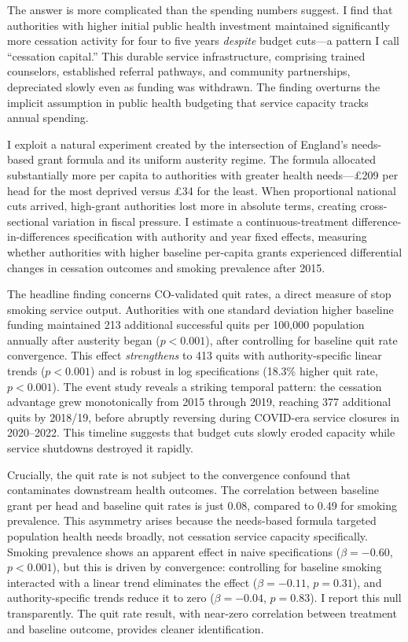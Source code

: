 \documentclass[12pt]{article}
\begin{document}
The answer is more complicated than the spending numbers suggest. I find that authorities with higher initial public health investment maintained significantly more cessation activity for four to five years \textit{despite} budget cuts---a pattern I call ``cessation capital.'' This durable service infrastructure, comprising trained counselors, established referral pathways, and community partnerships, depreciated slowly even as funding was withdrawn. The finding overturns the implicit assumption in public health budgeting that service capacity tracks annual spending.

I exploit a natural experiment created by the intersection of England's needs-based grant formula and its uniform austerity regime. The formula allocated substantially more per capita to authorities with greater health needs---\pounds209 per head for the most deprived versus \pounds34 for the least. When proportional national cuts arrived, high-grant authorities lost more in absolute terms, creating cross-sectional variation in fiscal pressure. I estimate a continuous-treatment difference-in-differences specification with authority and year fixed effects, measuring whether authorities with higher baseline per-capita grants experienced differential changes in cessation outcomes and smoking prevalence after 2015.

The headline finding concerns CO-validated quit rates, a direct measure of stop smoking service output. Authorities with one standard deviation higher baseline funding maintained 213 additional successful quits per 100,000 population annually after austerity began ($p < 0.001$), after controlling for baseline quit rate convergence. This effect \textit{strengthens} to 413 quits with authority-specific linear trends ($p < 0.001$) and is robust in log specifications (18.3\% higher quit rate, $p < 0.001$). The event study reveals a striking temporal pattern: the cessation advantage grew monotonically from 2015 through 2019, reaching 377 additional quits by 2018/19, before abruptly reversing during COVID-era service closures in 2020--2022. This timeline suggests that budget cuts slowly eroded capacity while service shutdowns destroyed it rapidly.

Crucially, the quit rate is not subject to the convergence confound that contaminates downstream health outcomes. The correlation between baseline grant per head and baseline quit rates is just 0.08, compared to 0.49 for smoking prevalence. This asymmetry arises because the needs-based formula targeted population health needs broadly, not cessation service capacity specifically. Smoking prevalence shows an apparent effect in naive specifications ($\beta = -0.60$, $p < 0.001$), but this is driven by convergence: controlling for baseline smoking interacted with a linear trend eliminates the effect ($\beta = -0.11$, $p = 0.31$), and authority-specific trends reduce it to zero ($\beta = -0.04$, $p = 0.83$). I report this null transparently. The quit rate result, with near-zero correlation between treatment and baseline outcome, provides cleaner identification.
\end{document}
